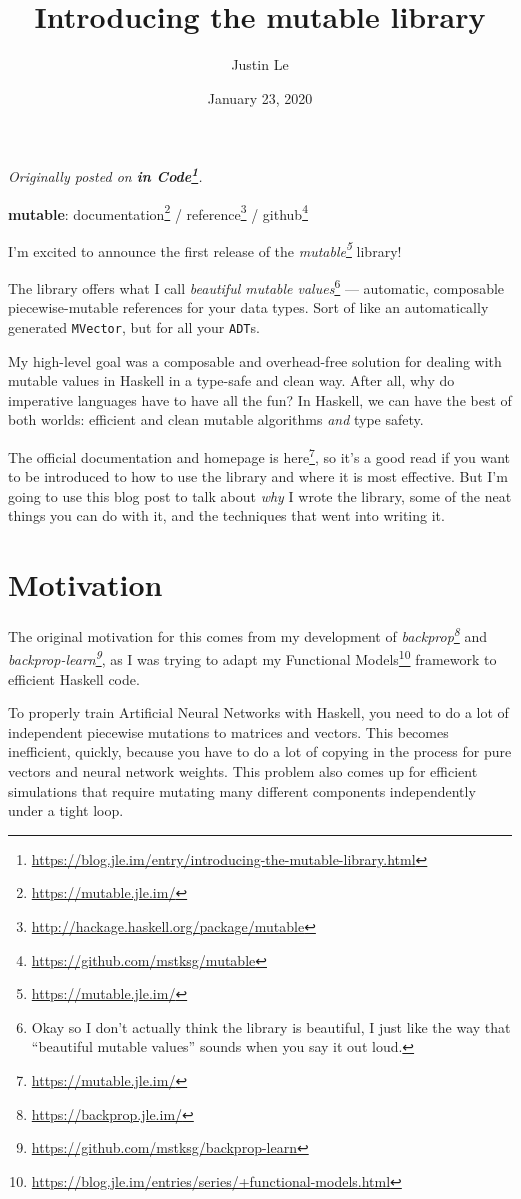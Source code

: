 \documentclass[]{article}
\title{Introducing the mutable library}
\author{Justin Le}
\date{January 23, 2020}
\renewcommand{\href}[2]{#2\footnote{\url{#1}}}
\begin{document}
\maketitle

\emph{Originally posted on
\textbf{\href{https://blog.jle.im/entry/introducing-the-mutable-library.html}{in
Code}}.}

\textbf{mutable}: \href{https://mutable.jle.im/}{documentation} /
\href{http://hackage.haskell.org/package/mutable}{reference} /
\href{https://github.com/mstksg/mutable}{github}

I'm excited to announce the first release of the
\emph{\href{https://mutable.jle.im/}{mutable}} library!

The library offers what I call \emph{beautiful mutable values}\footnote{Okay so
  I don't actually think the library is beautiful, I just like the way that
  ``beautiful mutable values'' sounds when you say it out loud.} --- automatic,
composable piecewise-mutable references for your data types. Sort of like an
automatically generated \texttt{MVector}, but for all your \texttt{ADT}s.

My high-level goal was a composable and overhead-free solution for dealing with
mutable values in Haskell in a type-safe and clean way. After all, why do
imperative languages have to have all the fun? In Haskell, we can have the best
of both worlds: efficient and clean mutable algorithms \emph{and} type safety.

The \href{https://mutable.jle.im/}{official documentation and homepage is here},
so it's a good read if you want to be introduced to how to use the library and
where it is most effective. But I'm going to use this blog post to talk about
\emph{why} I wrote the library, some of the neat things you can do with it, and
the techniques that went into writing it.

\hypertarget{motivation}{%
\section{Motivation}\label{motivation}}

The original motivation for this comes from my development of
\emph{\href{https://backprop.jle.im/}{backprop}} and
\emph{\href{https://github.com/mstksg/backprop-learn}{backprop-learn}}, as I was
trying to adapt my
\href{https://blog.jle.im/entries/series/+functional-models.html}{Functional
Models} framework to efficient Haskell code.

To properly train Artificial Neural Networks with Haskell, you need to do a lot
of independent piecewise mutations to matrices and vectors. This becomes
inefficient, quickly, because you have to do a lot of copying in the process for
pure vectors and neural network weights. This problem also comes up for
efficient simulations that require mutating many different components
independently under a tight loop.
\end{document}

